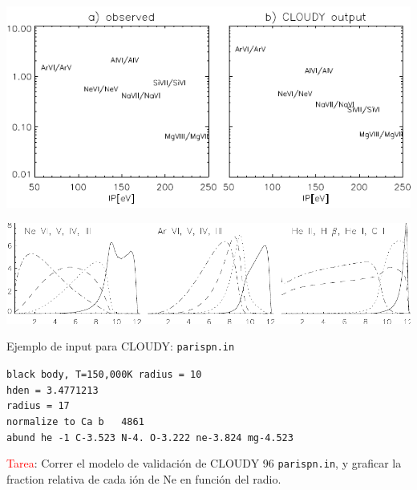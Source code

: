 \vspace{4cm}
\begin{center}
  \includegraphics[width=25cm,height=!]{ioncurve.pdf}
\end{center}


\vspace{10cm}
\begin{center}
  \includegraphics[width=25cm,height=!]{struct_n6302.pdf}
\end{center}





\bgclear

Ejemplo de input para CLOUDY: {\tt parispn.in}\\

\medskip
\medskip
\medskip

{\tt black body, T=150,000K radius = 10\\
hden = 3.4771213\\
radius = 17\\
normalize to   Ca b  ~ 4861\\
abund he -1 C-3.523 N-4. O-3.222 ne-3.824 mg-4.523\\ 
}

\medskip

\textcolor{red}{Tarea}: Correr el modelo de validaci\'on de CLOUDY 96
{\tt parispn.in}, y graficar la fraction relativa de cada i\'on de Ne
en funci\'on del radio.




